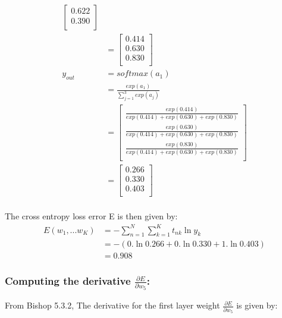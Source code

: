 \documentclass[a4paper]{article}
\begin{document}
\begin{align*}
       \left[\begin{matrix}
        0.622 \\
        0.390 \\
       \end{matrix} \right] \\
    &= \left[\begin{matrix}
        0.414 \\
        0.630 \\
        0.830 \\
       \end{matrix} \right] \\
    y_{out} &= softmax(a_1) \\
    &= \frac{exp(a_{1})}{\sum_{j=1}^{3}exp(a_{j})} \\
    &= \left[\begin{matrix}     
        \frac{exp(0.414)}{exp(0.414) + exp(0.630) + exp(0.830)} \\
        \frac{exp(0.630)}{exp(0.414) + exp(0.630) + exp(0.830)} \\
        \frac{exp(0.830)}{exp(0.414) + exp(0.630) + exp(0.830)} \\
       \end{matrix} \right] \\
    &= \left[\begin{matrix}
        0.266 \\
        0.330 \\
        0.403 \\
       \end{matrix} \right] \\
\end{align*}{}

The cross entropy loss error E is then given by:
\begin{align*}
    E(w_{1},...w_{K}) &= -\sum_{n=1}^{N}\sum_{k=1}^{K}t_{nk}\ln{y_{k}} \\
    &= -(0.\ln{0.266} + 0.\ln{0.330} + 1.\ln{0.403}) \\
    &= 0.908
\end{align*}{}

\subsubsection*{Computing the derivative $\frac{\partial E}{\partial w_{5}}$:}

From Bishop 5.3.2, The derivative for the first layer weight $\frac{\partial E}{\partial w_{5}}$ is given by:
\end{document}
